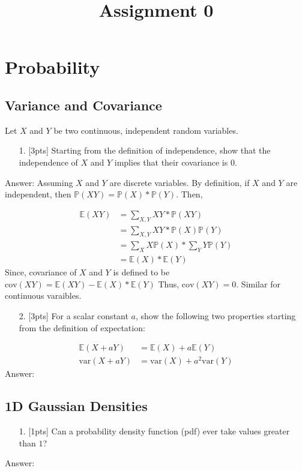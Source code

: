 \documentclass[12pt,a4paper]{article}
\title{ Assignment 0 }
\author{ Jiaqi Sun (#998181747) }
\begin{document}
\maketitle

\section{Probability}
\subsection{Variance and Covariance}
Let $X$ and $Y$ be two continuous, independent random variables.

\begin{itemize}
\item[1. ] [3pts] Starting from the definition of independence, show that the independence of $X$ and $Y$ implies that their covariance is $0$.

\end{itemize}
Answer: Assuming $X$ and $Y$ are discrete variables. By definition, if $X$ and $Y$ are independent, then $\mathbb{P}(XY) = \mathbb{P}(X) * \mathbb{P}(Y)$. Then,


\begin{align}
\mathbb{E}(XY) &= \sum_{X,Y} XY * \mathbb{P}(XY)\\
&=\sum_{X,Y} XY * \mathbb{P}(X)\mathbb{P}(Y)\\
&=\sum_{X} X\mathbb{P}(X) * \sum_{Y} Y\mathbb{P}(Y)\\
&=\mathbb{E}(X) * \mathbb{E}(Y)
\end{align}
Since, covariance of $X$ and $Y$ is defined to be $\text{cov}(XY) = \mathbb{E}(XY) - \mathbb{E}(X) * \mathbb{E}(Y)$ Thus, $\text{cov}(XY) = 0$. Similar for continuous varaibles.

\begin{itemize}
\item[2. ] [3pts] For a scalar constant $a$, show the following two properties starting from the definition of expectation:

\end{itemize}

\begin{align}
\mathbb{E}(X+aY) &= \mathbb{E}(X) + a\mathbb{E}(Y)\\
\text{var}(X + aY) &= \text{var}(X) + a^2 \text{var}(Y)
\end{align}
Answer:

\subsection{1D Gaussian Densities}
\begin{itemize}
\item[1. ] [1pts] Can a probability density function (pdf) ever take values greater than $1$?

\end{itemize}
Answer:
\end{document}
